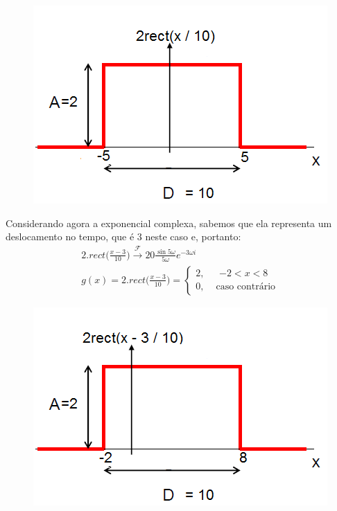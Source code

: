 \documentclass[12pt]{article}
\begin{document}
\begin{itemize}
\begin{itemize}
\begin{figure}[htb]
\centering   
\begin{minipage}[b]{0.45\textwidth}
	\centering
        \includegraphics[scale=0.45]{Q3Images/pulse_function_2.png} 
\end{minipage}
\end{figure}

Considerando agora a exponencial complexa, sabemos que ela representa um deslocamento no tempo,
que é $3$ neste caso e, portanto:
\begin{align*}
    2 . rect\bigg(\frac{x-3}{10}\bigg) \xrightarrow{\mathscr{F}} 20\frac{\sin 5\omega}{5\omega}e^{-3\omega i} \\
    g(x) = 2 . rect\bigg(\frac{x-3}{10}\bigg) = \left\{ \begin{array}{rl} 
     2, &\mbox{ $-2 < x < 8$} \\
     0, &\mbox{ caso contrário}
           \end{array} \right.
\end{align*}
\begin{figure}[htb]
\centering   
\begin{minipage}[b]{0.45\textwidth}
	\centering
        \includegraphics[scale=0.45]{Q3Images/pulse_function_3.png} 
\end{minipage}
\end{figure}



\end{itemize}
\end{itemize}
\end{document}

